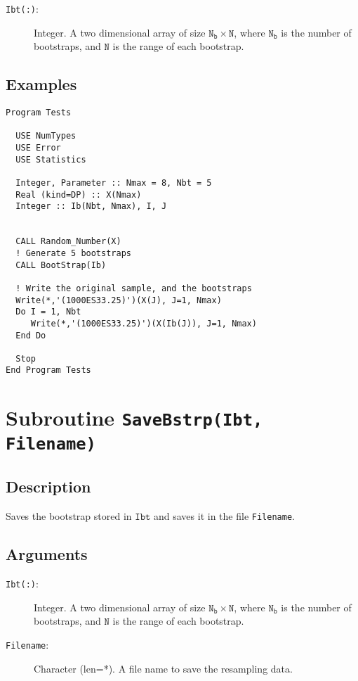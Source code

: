 \begin{description}
\item[\texttt{Ibt(:)}:] Integer. A two dimensional array of size
  $\mathtt{N_b\times N}$, where $\mathtt{N_b}$ is the number of
  bootstraps, and $\mathtt{N}$ is the range of each bootstrap.
\end{description}

\subsection{Examples}

\begin{lstlisting}[emph=Bootstrap,
                   emphstyle=\color{blue},
                   frame=trBL,
                   caption=Resampling some data.,
                   label=bootstrap]
Program Tests

  USE NumTypes
  USE Error
  USE Statistics

  Integer, Parameter :: Nmax = 8, Nbt = 5
  Real (kind=DP) :: X(Nmax)
  Integer :: Ib(Nbt, Nmax), I, J


  CALL Random_Number(X)
  ! Generate 5 bootstraps
  CALL BootStrap(Ib)

  ! Write the original sample, and the bootstraps
  Write(*,'(1000ES33.25)')(X(J), J=1, Nmax) 
  Do I = 1, Nbt
     Write(*,'(1000ES33.25)')(X(Ib(J)), J=1, Nmax) 
  End Do

  Stop
End Program Tests
\end{lstlisting}

\section{Subroutine \texttt{SaveBstrp(Ibt, Filename)}}

\subsection{Description}

Saves the bootstrap stored in $\mathtt{Ibt}$ and saves it in the file
\texttt{Filename}.

\subsection{Arguments}

\begin{description}
\item[\texttt{Ibt(:)}:] Integer. A two dimensional array of size
  $\mathtt{N_b\times N}$, where $\mathtt{N_b}$ is the number of
  bootstraps, and $\mathtt{N}$ is the range of each bootstrap.
\item[\texttt{Filename}: ] Character (len=*). A file name to save the
  resampling data.
\end{description}

